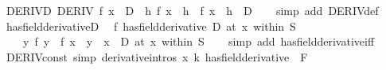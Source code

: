 \begin{isabellebody}
{}
\isamarkuptrue%
%
\endisatagdocument
{\isafolddocument}%
%
\isadelimdocument
%
\endisadelimdocument
{}\isamarkupfalse%
\ DERIV{\isacharunderscore}{\kern0pt}D{\isacharcolon}{\kern0pt}\ {\isachardoublequoteopen}DERIV\ f\ x\ {\isacharcolon}{\kern0pt}{\isachargreater}{\kern0pt}\ D\ {\isasymLongrightarrow}\ {\isacharparenleft}{\kern0pt}{\isasymlambda}h{\isachardot}{\kern0pt}\ {\isacharparenleft}{\kern0pt}f\ {\isacharparenleft}{\kern0pt}x\ {\isacharplus}{\kern0pt}\ h{\isacharparenright}{\kern0pt}\ {\isacharminus}{\kern0pt}\ f\ x{\isacharparenright}{\kern0pt}\ {\isacharslash}{\kern0pt}\ h{\isacharparenright}{\kern0pt}\ {\isasymmidarrow}{}{\isasymrightarrow}\ D{\isachardoublequoteclose}\isanewline
%
\isadelimproof
\ \ %
\endisadelimproof
%
\isatagproof
{}\isamarkupfalse%
\ {\isacharparenleft}{\kern0pt}simp\ add{\isacharcolon}{\kern0pt}\ DERIV{\isacharunderscore}{\kern0pt}def{\isacharparenright}{\kern0pt}%
\endisatagproof
{\isafoldproof}%
%
\isadelimproof
\isanewline
%
\endisadelimproof
\isanewline
{}\isamarkupfalse%
\ has{\isacharunderscore}{\kern0pt}field{\isacharunderscore}{\kern0pt}derivativeD{\isacharcolon}{\kern0pt}\isanewline
\ \ {\isachardoublequoteopen}{\isacharparenleft}{\kern0pt}f\ has{\isacharunderscore}{\kern0pt}field{\isacharunderscore}{\kern0pt}derivative\ D{\isacharparenright}{\kern0pt}\ {\isacharparenleft}{\kern0pt}at\ x\ within\ S{\isacharparenright}{\kern0pt}\ {\isasymLongrightarrow}\isanewline
\ \ \ \ {\isacharparenleft}{\kern0pt}{\isacharparenleft}{\kern0pt}{\isasymlambda}y{\isachardot}{\kern0pt}\ {\isacharparenleft}{\kern0pt}f\ y\ {\isacharminus}{\kern0pt}\ f\ x{\isacharparenright}{\kern0pt}\ {\isacharslash}{\kern0pt}\ {\isacharparenleft}{\kern0pt}y\ {\isacharminus}{\kern0pt}\ x{\isacharparenright}{\kern0pt}{\isacharparenright}{\kern0pt}\ {\isasymlonglongrightarrow}\ D{\isacharparenright}{\kern0pt}\ {\isacharparenleft}{\kern0pt}at\ x\ within\ S{\isacharparenright}{\kern0pt}{\isachardoublequoteclose}\isanewline
%
\isadelimproof
\ \ %
\endisadelimproof
%
\isatagproof
{}\isamarkupfalse%
\ {\isacharparenleft}{\kern0pt}simp\ add{\isacharcolon}{\kern0pt}\ has{\isacharunderscore}{\kern0pt}field{\isacharunderscore}{\kern0pt}derivative{\isacharunderscore}{\kern0pt}iff{\isacharparenright}{\kern0pt}%
\endisatagproof
{\isafoldproof}%
%
\isadelimproof
\isanewline
%
\endisadelimproof
\isanewline
{}\isamarkupfalse%
\ DERIV{\isacharunderscore}{\kern0pt}const\ {\isacharbrackleft}{\kern0pt}simp{\isacharcomma}{\kern0pt}\ derivative{\isacharunderscore}{\kern0pt}intros{\isacharbrackright}{\kern0pt}{\isacharcolon}{\kern0pt}\ {\isachardoublequoteopen}{\isacharparenleft}{\kern0pt}{\isacharparenleft}{\kern0pt}{\isasymlambda}x{\isachardot}{\kern0pt}\ k{\isacharparenright}{\kern0pt}\ has{\isacharunderscore}{\kern0pt}field{\isacharunderscore}{\kern0pt}derivative\ {}{\isacharparenright}{\kern0pt}\ F{\isachardoublequoteclose}\isanewline

\end{isabellebody}
